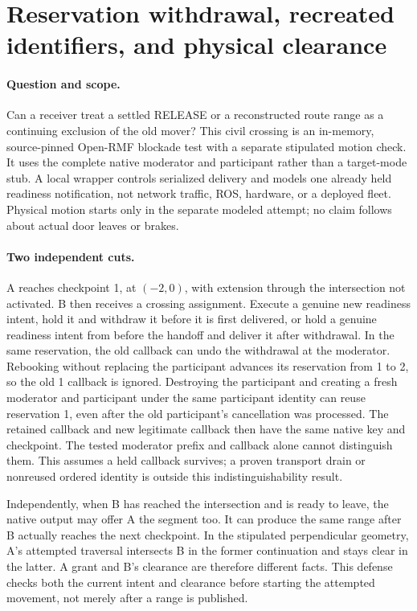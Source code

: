 \documentclass{article}
\begin{document}
\section*{Reservation withdrawal, recreated identifiers, and physical clearance}
\paragraph{Question and scope.}
Can a receiver treat a settled RELEASE or a reconstructed route range
as a continuing exclusion of the old mover? This civil crossing is an
in-memory, source-pinned Open-RMF blockade test with a separate stipulated
motion check. It uses the complete native moderator and participant rather
than a target-mode stub. A local wrapper controls serialized delivery and
models one already held readiness notification, not network traffic,
ROS, hardware, or a deployed fleet. Physical motion starts only in
the separate modeled attempt; no claim follows about actual door leaves or brakes.

\paragraph{Two independent cuts.}
A reaches checkpoint 1, at $(-2,0)$, with extension through the intersection
not activated. B then receives a crossing assignment. Execute a genuine
new readiness intent, hold it and withdraw it before it is first delivered,
or hold a genuine readiness intent from before the handoff and deliver it
after withdrawal. In the same reservation, the old callback can undo the
withdrawal at the moderator. Rebooking without replacing the participant
advances its reservation from 1 to 2, so the old 1 callback is ignored.
Destroying the participant and creating a fresh moderator and participant
under the same participant identity can reuse reservation 1, even after
the old participant's cancellation was processed. The retained callback
and new legitimate callback then have the same native key and checkpoint.
The tested moderator prefix and callback alone cannot distinguish them.
This assumes a held callback survives; a proven transport drain or
nonreused ordered identity is outside this indistinguishability result.

Independently, when B has reached the intersection and is ready to leave,
the native output may offer A the segment too. It can produce the same
range after B actually reaches the next checkpoint. In the stipulated
perpendicular geometry, A's attempted traversal intersects B in the
former continuation and stays clear in the latter. A grant and B's clearance
are therefore different facts. This defense checks both the current intent
and clearance before starting the attempted movement, not merely after a
range is published.
\end{document}

